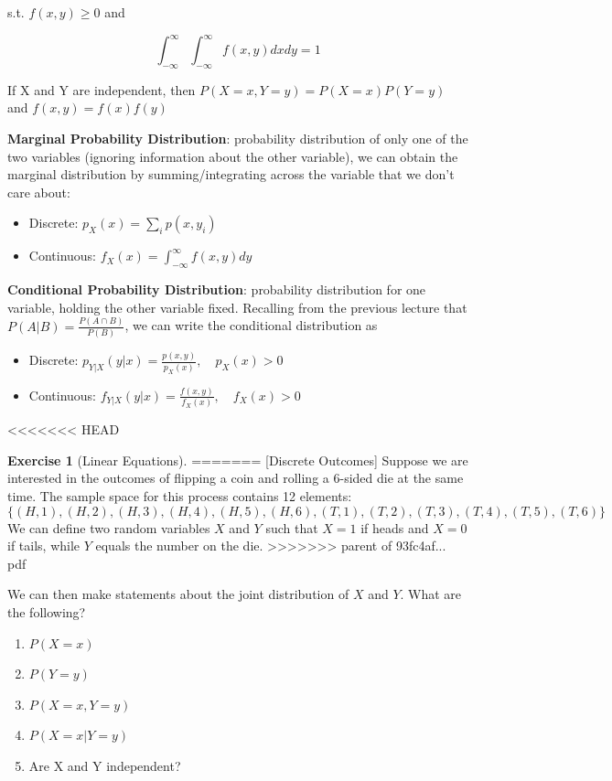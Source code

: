 \documentclass[]{book}
\providecommand{\tightlist}{%
  \setlength{\itemsep}{0pt}\setlength{\parskip}{0pt}}
\theoremstyle{definition}
\theoremstyle{definition}
\theoremstyle{definition}
\newtheorem{exercise}{Exercise}[chapter]
\theoremstyle{remark}
\begin{document}
s.t. \(f(x,y)\ge 0\) and

\[\int_{-\infty}^\infty\int_{-\infty}^\infty f(x,y)dxdy = 1\]

If X and Y are independent, then \(P(X=x,Y=y) = P(X=x)P(Y=y)\) and \(f(x,y) = f(x)f(y)\)

\textbf{Marginal Probability Distribution}: probability distribution of only one of the two variables (ignoring information about the other variable), we can obtain the marginal distribution by summing/integrating across the variable that we don't care about:

\begin{itemize}
\tightlist
\item
  Discrete: \(p_X(x) = \sum_i p(x, y_i)\)
\item
  Continuous: \(f_X(x) = \int_{-\infty}^\infty f(x,y)dy\)
\end{itemize}

\textbf{Conditional Probability Distribution}: probability distribution for one variable, holding the other variable fixed. Recalling from the previous lecture that \(P(A|B)=\frac{P(A\cap B)}{P(B)}\), we can write the conditional distribution as

\begin{itemize}
\tightlist
\item
  Discrete: \(p_{Y|X}(y|x) = \frac{p(x,y)}{p_X(x)}, \quad p_X(x) > 0\)
\item
  Continuous: \(f_{Y|X}(y|x) = \frac{f(x,y)}{f_X(x)},\quad f_X(x) > 0\)
\end{itemize}

<<<<<<< HEAD
\begin{exercise}[Linear Equations]
\protect\hypertarget{exr:lineareq}{}{\label{exr:lineareq} {} }
=======
[Discrete Outcomes]
\protect\hypertarget{exr:unnamed-chunk-82}{}{\label{exr:unnamed-chunk-82} {} }Suppose we are interested in the outcomes of flipping a coin and rolling a 6-sided die at the same time. The sample space for this process contains 12 elements: \[\{(H, 1), (H, 2), (H, 3), (H, 4), (H, 5), (H, 6), (T, 1), (T, 2), (T, 3), (T, 4), (T, 5), (T, 6)\}\] We can define two random variables \(X\) and \(Y\) such that \(X = 1\) if heads and \(X = 0\) if tails, while \(Y\) equals the number on the die.
>>>>>>> parent of 93fc4af... pdf

We can then make statements about the joint distribution of \(X\) and \(Y\). What are the following?

\begin{enumerate}
\def\labelenumi{\arabic{enumi}.}
\tightlist
\item
  \(P(X=x)\)
\item
  \(P(Y=y)\)
\item
  \(P(X=x, Y=y)\)
\item
  \(P(X=x|Y=y)\)
\item
  Are X and Y independent?
\end{enumerate}
\end{exercise}
\end{document}
